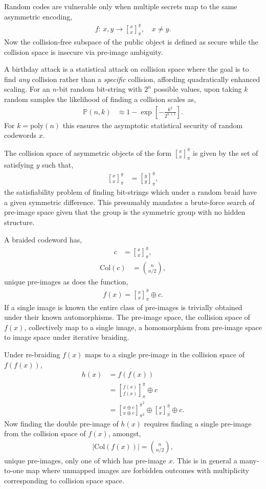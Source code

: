 \documentclass[twocolumn, aps, amsmath, amssymb, nofootinbib, superscriptaddress, longbibliography, doublefloatfix, table-of-contents, eqsecnum, rmp]{revtex4-2}
\newcommand{\stackbraid}[2]{{\genfrac{[}{]}{0pt}{}{{#1}}{{#2}}}^{\bar{\pi}}_{\pi}}
\newcommand{\stackbraidgen}[4]{{\genfrac{[}{]}{0pt}{}{{#1}}{{#2}}}^{#3}_{#4}}
\begin{document}
Random codes are vulnerable only when multiple secrets map to the same asymmetric encoding,
\begin{align}
	f:\, x,y \to \stackbraid{x}{x},\quad x\neq y.
\end{align}
Now the collision-free subspace of the public object is defined as secure while the collision space is insecure via pre-image ambiguity.

A birthday attack is a statistical attack on collision space where the goal is to find \emph{any} collision rather than a \emph{specific} collision, affording quadratically enhanced scaling. For an $n$-bit random bit-string with $2^n$ possible values, upon taking $k$ random samples the likelihood of finding a collision scales as,
\begin{align}
	\mathbb{P}(n,k) &\approx 1 - \exp\left[-\frac{k^2}{2^{n+1}}\right].
\end{align}
For $k=\mathrm{poly}(n)$ this ensures the asymptotic statistical security of random codewords $x$.

The collision space of asymmetric objects of the form $\stackbraid{x}{x}$ is given by the set of satisfying $y$ such that,
\begin{align}
	\stackbraid{x}{x} &= \stackbraid{y}{y},
\end{align}
the satisfiability problem of finding bit-strings which under a random braid have a given symmetric difference. This presumably mandates a brute-force search of pre-image space given that the group is the symmetric group with no hidden structure.

A braided codeword has,
\begin{align}
	c &= \stackbraid{x}{x},
\end{align}
\begin{align}
	\mathrm{Col}(c) &= \binom{n}{n/2},
\end{align}
unique pre-images as does the function,
\begin{align}
	f(x) = \stackbraid{x}{x}\oplus c.
\end{align}
If a single image is known the entire class of pre-images is trivially obtained under their known automorphisms. The pre-image space, the collision space of $f(x)$, collectively map to a single image, a homomorphism from pre-image space to image space under iterative braiding.

Under re-braiding $f(x)$ maps to a single pre-image in the collision space of $f(f(x))$,
\begin{align}
	h(x) &= f(f(x)) \nonumber\\
	&=\stackbraid{f(x)}{f(x)}\oplus c \nonumber\\
	&= \stackbraidgen{x\oplus c}{x\oplus c}{\bar{\pi}^2}{\pi^2} \oplus \stackbraid{x}{x} \oplus c.
\end{align}
Now finding the double pre-image of $h(x)$ requires finding a single pre-image from the collision space of $f(x)$, amongst,
\begin{align}
	|\mathrm{Col}(f(x))| = \binom{n}{n/2},
\end{align}
unique pre-images, only one of which has pre-image $x$. This is in general a many-to-one map where unmapped images are forbidden outcomes with multiplicity corresponding to collision space space.
\end{document}
